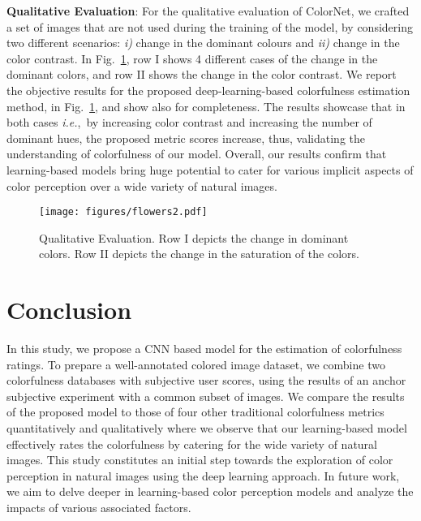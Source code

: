 \documentclass{article}
\newcommand{\ie}[0]{\textit{i.e.},~}
\begin{document}
\textbf{Qualitative Evaluation}:
For the qualitative evaluation of ColorNet, we crafted a set of images that are not used during the training of the model, by considering two different scenarios: \textit{i)} change in the dominant colours and \textit{ii)} change in the color contrast. In Fig.~\ref{fig:flowers}, row I shows 4 different cases of the change in the dominant colors, and row II shows the change in the color contrast. We report the objective results for the proposed deep-learning-based colorfulness estimation method, in Fig.~\ref{fig:flowers}, and show also  for completeness. The results showcase that in both cases \ie by increasing color contrast and increasing the number of dominant hues, the proposed metric scores increase, thus, validating the understanding of colorfulness of our model. Overall, our results confirm that learning-based models bring huge potential to cater for various implicit aspects of color perception over a wide variety of natural images.  


\begin{figure}[tb]
    \centering
    \texttt{[image: figures/flowers2.pdf]}
  \caption{Qualitative Evaluation. Row I depicts the change in dominant colors. Row II depicts the change in the saturation of the colors.}
  \label{fig:flowers}
  \vspace{-4pt}
\end{figure}
















 

\section{Conclusion}
\label{sec:conclusion}

In this study, we propose a CNN based model for the estimation of colorfulness ratings. To prepare a well-annotated colored image dataset, we combine two colorfulness databases with subjective user scores, using the results of an anchor subjective experiment with a common subset of images. We compare the results of the proposed model to those of four other traditional colorfulness metrics quantitatively and qualitatively where we observe that our learning-based model effectively rates the colorfulness by catering for the wide variety of natural images. This study constitutes an initial step towards the exploration of color perception in natural images using the deep learning approach. In future work, we aim to delve deeper in learning-based color perception models and analyze the impacts of various associated factors. 

\footnotesize


\end{document}
